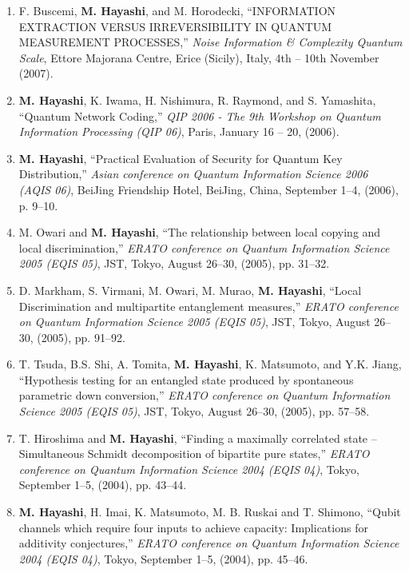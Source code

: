 \documentclass[a4paper,12pt,oneside]{article}
\begin{document}
\begin{enumerate}
\item
F. Buscemi, \textbf{M. Hayashi}, and M. Horodecki, ``INFORMATION EXTRACTION VERSUS IRREVERSIBILITY IN QUANTUM MEASUREMENT PROCESSES,'' 
{\em Noise Information \& Complexity \@ Quantum Scale}, 
Ettore Majorana Centre, Erice (Sicily), Italy, 4th -- 10th November (2007). 


\item
\textbf{M. Hayashi}, K. Iwama, H. Nishimura, R. Raymond, and S. Yamashita, ``Quantum Network Coding,'' 
{\em QIP 2006 - The 9th Workshop on Quantum Information Processing (QIP 06)}, 
Paris, January 16 -- 20, (2006).


\item
\textbf{M. Hayashi}, ``Practical Evaluation of Security for Quantum Key Distribution,'' 
{\em Asian conference on Quantum Information Science 2006 (AQIS 06)}, 
BeiJing Friendship Hotel, BeiJing, China, September 1--4, (2006), p. 9--10.


\item
M. Owari and \textbf{M. Hayashi}, ``The relationship between local copying and local discrimination,'' 
{\em ERATO conference on Quantum Information Science 2005 (EQIS 05)}, 
JST, Tokyo, August 26--30, (2005), pp. 31--32.

\item
D. Markham, S. Virmani, M. Owari, M. Murao, \textbf{M. Hayashi}, ``Local Discrimination and multipartite entanglement measures,'' 
{\em ERATO conference on Quantum Information Science 2005 (EQIS 05)}, 
JST, Tokyo, August 26--30, (2005), pp. 91--92.

\item
T. Tsuda, B.S. Shi, A. Tomita, \textbf{M. Hayashi}, K. Matsumoto, and Y.K. Jiang, ``Hypothesis testing for an entangled state produced by spontaneous parametric down conversion,'' 
{\em ERATO conference on Quantum Information Science 2005 (EQIS 05)}, 
JST, Tokyo, August 26--30, (2005), pp. 57--58.


\item
T. Hiroshima and \textbf{M. Hayashi}, ``Finding a maximally correlated state -- Simultaneous Schmidt decomposition of bipartite pure states,'' 
{\em ERATO conference on Quantum Information Science 2004 (EQIS 04)}, 
Tokyo, September 1--5, (2004), pp. 43--44.

\item
\textbf{M. Hayashi}, H. Imai, K. Matsumoto, M. B. Ruskai and T. Shimono, ``Qubit channels which require four inputs to achieve capacity: Implications for additivity conjectures,'' 
{\em ERATO conference on Quantum Information Science 2004 (EQIS 04)}, 
Tokyo, September 1--5, (2004), 
pp. 45--46.


\end{enumerate}
\end{document}

